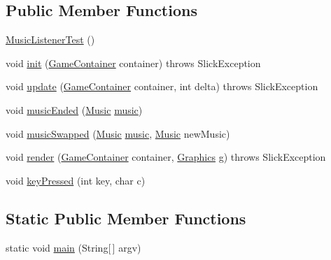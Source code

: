 \subsection*{Public Member Functions}
\begin{DoxyCompactItemize}
\item 
\mbox{\hyperlink{classorg_1_1newdawn_1_1slick_1_1tests_1_1_music_listener_test_a7417ff7ac4e26a349ed7483f97f46641}{Music\+Listener\+Test}} ()
\item 
void \mbox{\hyperlink{classorg_1_1newdawn_1_1slick_1_1tests_1_1_music_listener_test_a66a6f7c9fed4bf8491ca9a6f1016254b}{init}} (\mbox{\hyperlink{classorg_1_1newdawn_1_1slick_1_1_game_container}{Game\+Container}} container)  throws Slick\+Exception 
\item 
void \mbox{\hyperlink{classorg_1_1newdawn_1_1slick_1_1tests_1_1_music_listener_test_ab964494387720fd726eedb546313ea16}{update}} (\mbox{\hyperlink{classorg_1_1newdawn_1_1slick_1_1_game_container}{Game\+Container}} container, int delta)  throws Slick\+Exception 
\item 
void \mbox{\hyperlink{classorg_1_1newdawn_1_1slick_1_1tests_1_1_music_listener_test_aba42fdf23841e22f89ef620b1b30fed1}{music\+Ended}} (\mbox{\hyperlink{classorg_1_1newdawn_1_1slick_1_1_music}{Music}} \mbox{\hyperlink{classorg_1_1newdawn_1_1slick_1_1tests_1_1_music_listener_test_a3548ac70c36c26e6f4215ab5f4ef9821}{music}})
\item 
void \mbox{\hyperlink{classorg_1_1newdawn_1_1slick_1_1tests_1_1_music_listener_test_afec2f67261476d841473bf75637cc595}{music\+Swapped}} (\mbox{\hyperlink{classorg_1_1newdawn_1_1slick_1_1_music}{Music}} \mbox{\hyperlink{classorg_1_1newdawn_1_1slick_1_1tests_1_1_music_listener_test_a3548ac70c36c26e6f4215ab5f4ef9821}{music}}, \mbox{\hyperlink{classorg_1_1newdawn_1_1slick_1_1_music}{Music}} new\+Music)
\item 
void \mbox{\hyperlink{classorg_1_1newdawn_1_1slick_1_1tests_1_1_music_listener_test_adbd4e2676732a88fecdc3a700390a78a}{render}} (\mbox{\hyperlink{classorg_1_1newdawn_1_1slick_1_1_game_container}{Game\+Container}} container, \mbox{\hyperlink{classorg_1_1newdawn_1_1slick_1_1_graphics}{Graphics}} g)  throws Slick\+Exception 
\item 
void \mbox{\hyperlink{classorg_1_1newdawn_1_1slick_1_1tests_1_1_music_listener_test_aa57671910286c4275625cddab1b59f9c}{key\+Pressed}} (int key, char c)
\end{DoxyCompactItemize}
\subsection*{Static Public Member Functions}
\begin{DoxyCompactItemize}
\item 
static void \mbox{\hyperlink{classorg_1_1newdawn_1_1slick_1_1tests_1_1_music_listener_test_a7f87a637f4a5b3c49cc898297c5e3a04}{main}} (String\mbox{[}$\,$\mbox{]} argv)
\end{DoxyCompactItemize}
